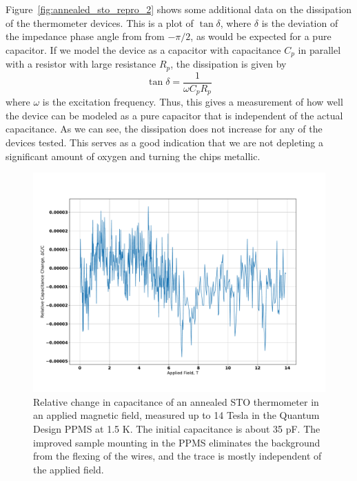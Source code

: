 \documentclass{thesis-umich}
\begin{document}
Figure~\ref{fig:annealed_sto_repro_2} shows some additional data on the dissipation of the thermometer devices. This is a plot of $\tan \delta$, where $\delta$ is the deviation of the impedance phase angle from from $-\pi/2$, as would be expected for a pure capacitor. If we model the device as a capacitor with capacitance $C_p$ in parallel with a resistor with large resistance $R_p$, the dissipation is given by~\cite{AHManual}
\[\tan \delta = \frac{1}{\omega C_p R_p}\] 
where $\omega$ is the excitation frequency. Thus, this gives a measurement of how well the device can be modeled as a pure capacitor that is independent of the actual capacitance. As we can see, the dissipation does not increase for any of the devices tested. This serves as a good indication that we are not depleting a significant amount of oxygen and turning the chips metallic.

\begin{figure} \caption[Field response of an annealed STO thermometer]{Relative change in capacitance of an annealed STO
	thermometer in an applied magnetic field, measured up to 14 Tesla in
the Quantum Design PPMS at 1.5 K. The initial capacitance is about 35 pF. The improved sample mounting in the PPMS eliminates
the background from the flexing of the wires, and the trace is mostly independent of the applied field.}
\label{fig:annealed_sto_field}
\includegraphics[width=\columnwidth]{figures/annealed_sto_dc_vs_b.pdf}
\end{figure}
\end{document}
